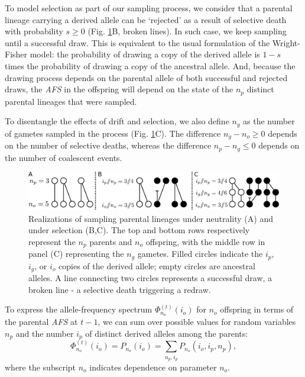 \documentclass[review,nonatbib]{elsarticle}
\newcommand{\afs}[2]{\Phi_{#1}^{(#2)}}
\begin{document}
To model selection as part of our sampling process, we consider that a parental lineage carrying a
derived allele can be `rejected' as a result of selective death with probability $s\ge0$ (Fig.
\ref{fig_schematic}B, broken lines). In such case, we keep sampling until a successful draw. This is
equivalent to the usual formulation of the Wright-Fisher model: the probability of drawing a copy of
the derived allele is $1-s$ times the probability of drawing a copy of the ancestral allele. And,
because the drawing process depends on the parental allele of both successful and rejected draws,
the \textit{AFS} in the offspring will depend on the state of the $n_p$ distinct parental lineages
that were sampled. %

To disentangle the effects of drift and selection, we also define $n_g$ as the number of gametes
sampled in the process (Fig. \ref{fig_schematic}C). The difference $n_g-n_o \ge 0$
depends on the number of selective deaths, whereas the difference $n_p-n_g \le 0$ depends
on the number of coalescent events.

\begin{figure}[h]
  \centering
  \includegraphics[width=1.0\textwidth]{fig/schematic.pdf}

  \caption{\label{fig_schematic} Realizations of sampling parental lineages under neutrality (A) and
    under selection (B,C). The top and bottom rows respectively represent the $n_p$ parents and
    $n_o$ offspring, with the middle row in panel (C) representing the $n_g$ gametes. Filled circles
    indicate the $i_p$, $i_g$, or $i_o$ copies of the derived allele; empty circles are ancestral
    alleles. A line connecting two circles represents a successful draw, a broken line - a selective
    death triggering a redraw. }

\end{figure}

To express the allele-frequency spectrum $\afs{n_o}{t}(i_o)$ for $n_o$ offspring in terms of the parental
\textit{AFS} at $t-1$, we can sum over possible values for random variables $n_p$ and the number $i_p$ of distinct derived alleles
among the parents:
\begin{equation}
  \afs{n_o}{t}(i_o)=P_{n_o} (i_o) =\sum_{n_p,i_p} P_{n_o}(i_o,i_p,n_p),
\end{equation}
where the subscript $n_o$ indicates dependence on parameter $n_o$. 
\end{document}
